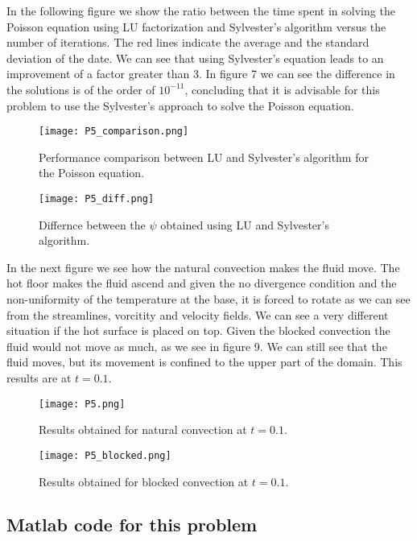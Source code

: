 In the following figure we show the ratio between the time spent in solving the Poisson equation using LU factorization and Sylvester's algorithm versus the number of iterations. The red lines indicate the average and the standard deviation of the date. We can see that using Sylvester's equation leads to an improvement of a factor greater than 3. In figure 7 we can see the difference in the solutions is of the order of $10^{-11}$, concluding that it is advisable for this problem to use the Sylvester's approach to solve the Poisson equation. 

\begin{figure}[H]
\centering
\texttt{[image: P5\_comparison.png]}\caption{Performance comparison between LU and Sylvester's algorithm for the Poisson equation.}
\end{figure}

\begin{figure}[H]
\centering
\texttt{[image: P5\_diff.png]}\caption{Differnce between the $\psi$ obtained using LU and Sylvester's algorithm.}
\end{figure}

In the next figure we see how the natural convection makes the fluid move. The hot floor makes the fluid ascend and given the no divergence condition and the non-uniformity of the temperature at the base, it is forced to rotate as we can see from the streamlines, vorcitity and velocity fields. We can see a very different situation if the hot surface is placed on top. Given the blocked convection the fluid would not move as much, as we see in figure 9. We can still see that the fluid moves, but its movement is confined to the upper part of the domain. This results are at $t=0.1$.

\begin{figure}[H]
\centering
\texttt{[image: P5.png]}\caption{Results obtained for natural convection at $t=0.1$.}
\end{figure}

\begin{figure}[H]
\centering
\texttt{[image: P5\_blocked.png]}\caption{Results obtained for blocked convection at $t=0.1$.}
\end{figure}

\subsection*{Matlab code for this problem}

